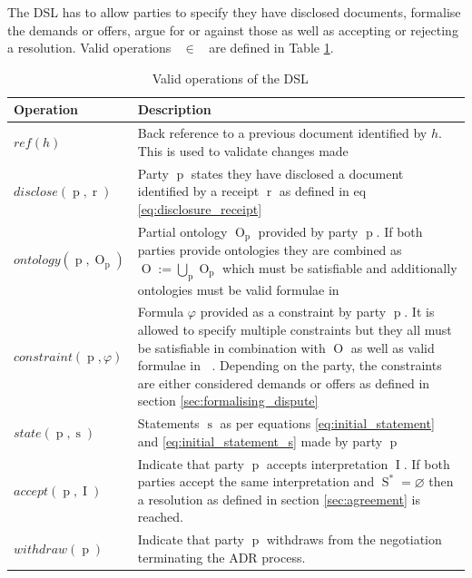 \documentclass[12pt,msc,a4paper,oneside]{ucl_thesis}
\DeclareMathOperator{\receipt}{r}
\DeclareMathOperator{\Metalang}{\mathcal{L}_m}
\DeclareMathOperator{\metaop}{\mathcal{o}_m}
\DeclareMathOperator{\Proplang}{\mathcal{L}(N)}
\DeclareMathOperator{\Interpretation}{I}
\DeclareMathOperator{\Ontology}{O}
\DeclareMathOperator{\Statement}{S}
\DeclareMathOperator{\statement}{s}
\DeclareMathOperator{\party}{p}
\begin{document}
The DSL has to allow parties to specify they have disclosed documents, formalise the demands or offers, argue for or against those as well as accepting or rejecting a resolution. Valid operations $\metaop \in \Metalang$ are defined in Table \ref{tab:dsl_operations}.

\begin{table}[!htbp]
    \centering
    \begin{tabularx}{\textwidth}{|l X|}
        \hline
        \textbf{Operation} & \textbf{Description} \\
        \hline
        $ref(h)$ & Back reference to a previous document identified by $h$. This is used to validate changes made \\
        $disclose(\party, \receipt)$ & Party $\party$ states they have disclosed a document identified by a receipt $\receipt$ as defined in eq \ref{eq:disclosure_receipt} \\
        $ontology(\party, \Ontology_{\party})$ & Partial ontology $\Ontology_{\party}$ provided by party $\party$. If both parties provide ontologies they are combined as $\Ontology := \bigcup\limits_{\party}\Ontology_{\party}$ which must be satisfiable and additionally ontologies must be valid formulae in $\Proplang$ \\
        $constraint(\party, \varphi)$ & Formula $\varphi$ provided as a constraint by party $\party$. It is allowed to specify multiple constraints but they all must be satisfiable in combination with $\Ontology$ as well as valid formulae in $\Proplang$. Depending on the party, the constraints are either considered demands or offers as defined in section \ref{sec:formalising_dispute} \\
        $state(\party, \statement)$ & Statements $\statement$ as per equations \ref{eq:initial_statement} and \ref{eq:initial_statement_s} made by party $\party$ \\
        $accept(\party, \Interpretation)$ & Indicate that party $\party$ accepts interpretation $\Interpretation$. If both parties accept the same interpretation and $\Statement^* = \varnothing$ then a resolution as defined in section \ref{sec:agreement} is reached. \\
        $withdraw(\party)$ & Indicate that party $\party$ withdraws from the negotiation terminating the ADR process. \\
        \hline
    \end{tabularx}
    \label{tab:dsl_operations}
    \caption{Valid operations of the DSL $\Metalang$}
\end{table}
\end{document}
